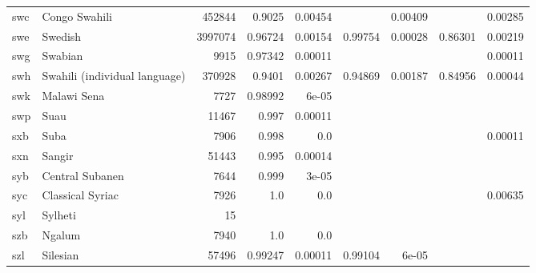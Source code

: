 \documentclass[11pt]{article}
\begin{document}
\begin{table*}[h]
{\begin{tabular}{llrrrrrrr}
swc         & Congo Swahili         & 452844         & 0.9025         & 0.00454         &          & 0.00409         &          & 0.00285         \\

swe         & Swedish         & 3997074         & 0.96724         & 0.00154         & 0.99754         & 0.00028         & 0.86301         & 0.00219         \\

swg         & Swabian         & 9915         & 0.97342         & 0.00011         &          &          &          & 0.00011         \\

swh         & Swahili (individual language)         & 370928         & 0.9401         & 0.00267         & 0.94869         & 0.00187         & 0.84956         & 0.00044         \\

swk         & Malawi Sena         & 7727         & 0.98992         & 6e-05         &          &          &          &          \\

swp         & Suau         & 11467         & 0.997         & 0.00011         &          &          &          &          \\

sxb         & Suba         & 7906         & 0.998         & 0.0         &          &          &          & 0.00011         \\

sxn         & Sangir         & 51443         & 0.995         & 0.00014         &          &          &          &          \\

syb         & Central Subanen         & 7644         & 0.999         & 3e-05         &          &          &          &          \\

syc         & Classical Syriac         & 7926         & 1.0         & 0.0         &          &          &          & 0.00635         \\

syl         & Sylheti         & 15         &          &          &          &          &          &          \\

szb         & Ngalum         & 7940         & 1.0         & 0.0         &          &          &          &          \\

szl         & Silesian         & 57496         & 0.99247         & 0.00011         & 0.99104         & 6e-05         &          &          \\


\end{tabular}}
\end{table*}
\end{document}

